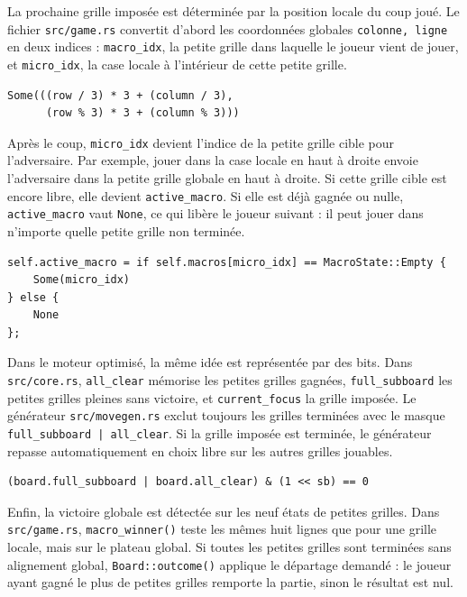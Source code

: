 \documentclass{pssbmac}
\begin{document}
La prochaine grille imposée est déterminée par la position locale du coup joué. Le fichier \texttt{src/game.rs} convertit d'abord les coordonnées globales \texttt{colonne, ligne} en deux indices : \texttt{macro\_idx}, la petite grille dans laquelle le joueur vient de jouer, et \texttt{micro\_idx}, la case locale à l'intérieur de cette petite grille.

\begin{lstlisting}[style=codeexcerpt,caption={Conversion d'un coup global en indices local/global dans \texttt{src/game.rs}}]
Some(((row / 3) * 3 + (column / 3),
      (row % 3) * 3 + (column % 3)))
\end{lstlisting}

Après le coup, \texttt{micro\_idx} devient l'indice de la petite grille cible pour l'adversaire. Par exemple, jouer dans la case locale en haut à droite envoie l'adversaire dans la petite grille globale en haut à droite. Si cette grille cible est encore libre, elle devient \texttt{active\_macro}. Si elle est déjà gagnée ou nulle, \texttt{active\_macro} vaut \texttt{None}, ce qui libère le joueur suivant : il peut jouer dans n'importe quelle petite grille non terminée.

\begin{lstlisting}[style=codeexcerpt,caption={Mise à jour de la grille imposée dans \texttt{src/game.rs}}]
self.active_macro = if self.macros[micro_idx] == MacroState::Empty {
    Some(micro_idx)
} else {
    None
};
\end{lstlisting}

Dans le moteur optimisé, la même idée est représentée par des bits. Dans \texttt{src/core.rs}, \texttt{all\_clear} mémorise les petites grilles gagnées, \texttt{full\_subboard} les petites grilles pleines sans victoire, et \texttt{current\_focus} la grille imposée. Le générateur \texttt{src/movegen.rs} exclut toujours les grilles terminées avec le masque \texttt{full\_subboard | all\_clear}. Si la grille imposée est terminée, le générateur repasse automatiquement en choix libre sur les autres grilles jouables.

\begin{lstlisting}[style=codeexcerpt,caption={Filtrage des petites grilles terminées dans \texttt{src/movegen.rs}}]
(board.full_subboard | board.all_clear) & (1 << sb) == 0
\end{lstlisting}

Enfin, la victoire globale est détectée sur les neuf états de petites grilles. Dans \texttt{src/game.rs}, \texttt{macro\_winner()} teste les mêmes huit lignes que pour une grille locale, mais sur le plateau global. Si toutes les petites grilles sont terminées sans alignement global, \texttt{Board::outcome()} applique le départage demandé : le joueur ayant gagné le plus de petites grilles remporte la partie, sinon le résultat est nul.
\end{document}

